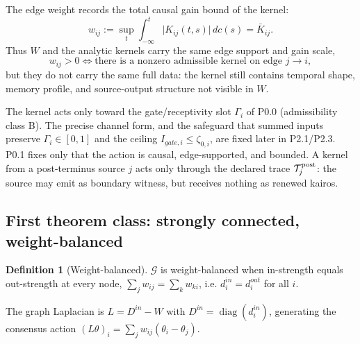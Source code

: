 \documentclass[11pt,a4paper]{article}
\def\mathfrak#1{#1}%
\def\mathrm#1{#1}%
\def\emph#1{#1}%
\theoremstyle{definition}
\newtheorem{definition}{Definition}[section]
\theoremstyle{plain}
\theoremstyle{remark}
\begin{document}
The edge weight records the total causal gain bound of the kernel:
\[
w_{ij}:=\sup_t\int_{-\infty}^{t}\bigl|K_{ij}(t,s)\bigr|\,d\mathfrak c(s)=\bar K_{ij}.
\]
Thus $W$ and the analytic kernels carry the same edge support and gain scale,
\[
w_{ij}>0\iff\text{there is a nonzero admissible kernel on edge }j\!\to\!i,
\]
but they do \emph{not} carry the same full data: the kernel still contains temporal
shape, memory profile, and source-output structure not visible in $W$.

The kernel acts only toward the gate/receptivity slot $\Gamma_i$ of P0.0
(admissibility class B). The precise channel form, and the safeguard that summed
inputs preserve $\Gamma_i\in[0,1]$ and the ceiling $I_{\mathrm{gate},i}\le\zeta_{0,i}$,
are fixed later in P2.1/P2.3. P0.1 fixes only that the action is causal,
edge-supported, and bounded. A kernel from a post-terminus source $j$ acts only
through the declared trace $\mathcal T_j^{\rm post}$: the source may emit as boundary
witness, but receives nothing as renewed kairos.

\subsection{First theorem class: strongly connected, weight-balanced}

\begin{definition}[Weight-balanced]
$\mathcal G$ is weight-balanced when in-strength equals out-strength at every node,
$\sum_j w_{ij}=\sum_k w_{ki}$, i.e. $d_i^{\mathrm{in}}=d_i^{\mathrm{out}}$ for all $i$.
\end{definition}

The graph Laplacian is $L=D^{\mathrm{in}}-W$ with $D^{\mathrm{in}}=\operatorname{diag}(d_i^{\mathrm{in}})$,
generating the consensus action $(L\theta)_i=\sum_j w_{ij}(\theta_i-\theta_j)$.
\end{document}
